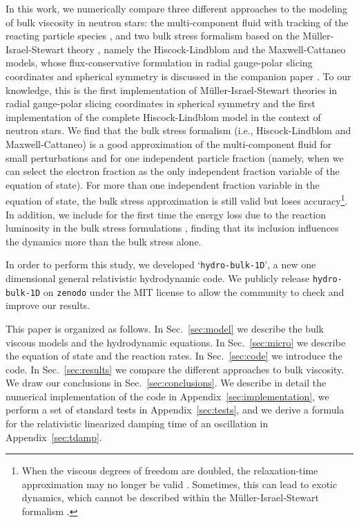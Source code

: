 \documentclass[aps,prd,twocolumn,a4paper,floatfix,nofootbib,superscriptaddress,nofootinbib]{revtex4}
\begin{document}
In this work, we numerically compare three different approaches to the modeling
of bulk viscosity in neutron stars: the multi-component fluid with tracking of
the reacting particle species \cite{Sawyer1989}, and two bulk stress formalism based on the
M\"uller-Israel-Stewart theory \cite{Israel_Stewart_1979}, namely the Hiscock-Lindblom \cite{Hiscock1983} and the Maxwell-Cattaneo \cite{Zakari93}
models, whose flux-conservative formulation in radial gauge-polar slicing
coordinates and spherical symmetry is discussed in the companion paper
\cite{Camelio22a}.
To our knowledge, this is the first implementation of M\"uller-Israel-Stewart
theories in radial gauge-polar slicing coordinates in spherical symmetry and the first implementation
of the complete Hiscock-Lindblom model in the context of neutron stars.
%
We find that the bulk stress formalism (i.e., Hiscock-Lindblom and
Maxwell-Cattaneo) is a good approximation of the multi-component fluid for small
perturbations and for one independent particle fraction (namely, when we can select the electron fraction as the only independent fraction variable of the equation of state). For more than one independent fraction variable in the equation of state, the bulk stress
approximation is still valid but loses accuracy\footnote{
When the viscous degrees of freedom are doubled, the relaxation-time approximation may no longer be valid \cite{NoronhaOrigin2011}. Sometimes, this can lead to exotic dynamics, which cannot be described within the M\"uller-Israel-Stewart formalism \cite{Heller2014}.}.  
In addition, we include for the first time the energy loss due to the reaction luminosity in the bulk stress
formulations \cite{Camelio22a}, finding that its inclusion influences the dynamics
more than the bulk stress alone.


In order to perform this study, we developed `\texttt{hydro-bulk-1D}', a new one
dimensional general relativistic hydrodynamic code. We publicly release \citep{Camelio22code}
\texttt{hydro-bulk-1D} on \texttt{zenodo} under the MIT license to allow the community
to check and improve our results.

This paper is organized as follows. In Sec.~\ref{sec:model} we describe the
bulk viscous models and the hydrodynamic equations.
In Sec.~\ref{sec:micro} we describe the equation
of state and the reaction rates.  In Sec.~\ref{sec:code} we introduce the
code. In Sec.~\ref{sec:results} we compare the
different approaches to bulk viscosity.  We draw our conclusions in
Sec.~\ref{sec:conclusions}. We describe in detail the numerical implementation
of the code in Appendix~\ref{sec:implementation}, we perform a set of
standard tests in Appendix~\ref{sec:tests}, and we derive a formula for the
relativistic linearized damping time of an oscillation in Appendix~\ref{sec:tdamp}.
\end{document}
